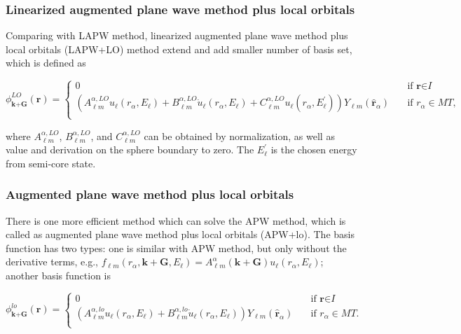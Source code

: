 \documentclass[a4paper, 12pt, titlepage,oneside,drop]{kthesis}
\begin{document}
\subsubsection{Linearized augmented plane wave method plus local orbitals}
Comparing with LAPW method, linearized augmented plane wave method plus local orbitals (LAPW+LO) method extend and add smaller number of basis set, which is defined as


\begin{equation}\label{lap5}
\phi^{LO}_{\textbf{k}+\textbf{G}}(\textbf{r}) = 
\begin{cases} 0 & \quad \mbox{if $\textbf{r} \in \textit{I} $}
\\
(A _{{\ell}m}^{\alpha,LO}  u_{{\ell}}(r_{\alpha}, E_{\ell}) + B _{{\ell}m}^{\alpha,LO}  \dot{u}_{{\ell}}(r_{\alpha}, E_{\ell}) + C _{{\ell}m}^{\alpha,LO}  u_{{\ell}}(r_{\alpha}, E^{\prime}_{\ell})){Y_{{\ell}m}(\hat{\textbf{r}}_{\alpha})} & \quad \mbox{if $r_{\alpha} \in MT, $}\\ 
\end{cases}
\end{equation}
 

where $A _{{\ell}m}^{\alpha,LO}$, $B _{{\ell}m}^{\alpha,LO}$, and $C _{{\ell}m}^{\alpha,LO}$ can be obtained by normalization, as well as value and derivation on the sphere boundary to zero. The $E^{\prime}_{\ell}$ is
the chosen energy from semi-core state.

\subsubsection{Augmented plane wave method plus local orbitals}

There is one more efficient method which can solve the APW method, which is called as augmented plane wave method plus local orbitals (APW+lo). The 
basis function has two types: one is similar with APW method, but only without the derivative terms, e.g., $f_{{\ell}{m}} (r_{\alpha},\textbf{k}+\textbf{G} ,E_{\ell}) =  A _{{\ell}m}^{\alpha}(\textbf{k}+\textbf{G})u_{{\ell}}(r_{\alpha}, E_{\ell})$; 
another basis function is

\begin{equation}\label{lap6}
\phi^{lo}_\textbf{k+G} (\textbf{r}) = 
\begin{cases} 0 & \quad \mbox{if $\textbf{r} \in \textit{I} $}
\\
(A _{{\ell}m}^{\alpha,lo}  u_{{\ell}}(r_{\alpha}, E_{\ell}) + B _{{\ell}m}^{\alpha,lo}  \dot{u}_{{\ell}}(r_{\alpha}, E_{\ell}) ){Y_{{\ell}m}(\hat{\textbf{r}}_{\alpha})} & \quad \mbox{if $r_{\alpha} \in MT. $}\\ 
\end{cases}
\end{equation}
 
\end{document}
